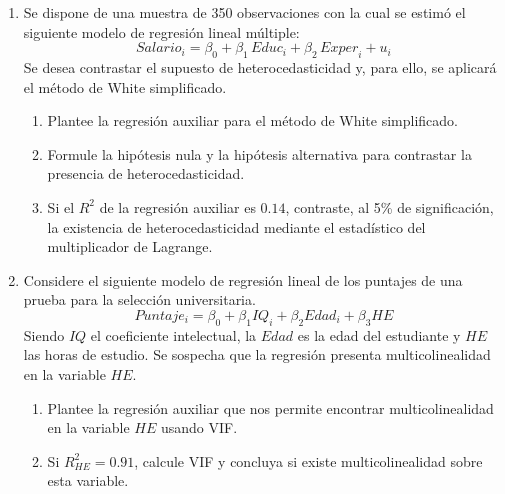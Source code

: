 \documentclass[10pt,a4paper]{article}
\begin{document}
\begin{enumerate}

\item Se dispone de una muestra de 350 observaciones con la cual se estimó el siguiente modelo de regresión lineal múltiple:
$$Salario_i = \beta_0 + \beta_1\,\textit{Educ}_i + \beta_2\,\textit{Exper}_i + u_i$$
Se desea contrastar el supuesto de heterocedasticidad y, para ello, se aplicará el método de White simplificado.
\begin{enumerate}
    \item  Plantee la regresión auxiliar para el método de White simplificado.\\
   
    
    \item  Formule la hipótesis nula y la hipótesis alternativa para contrastar la presencia de heterocedasticidad.\\
    
    
    \item  Si el $R^2$ de la regresión auxiliar es $0.14$, contraste, al 5\% de significación, la existencia de heterocedasticidad mediante el estadístico del multiplicador de Lagrange.\\
    
\end{enumerate}

\item  Considere el siguiente modelo de regresión lineal  de los puntajes de una prueba para la selección universitaria.
$$Puntaje_i = \beta_0 + \beta_1 IQ_i + \beta_2 Edad_i + \beta_3 HE$$
Siendo $IQ$ el coeficiente intelectual, la $Edad$ es la edad del estudiante y $HE$ las horas de estudio. Se sospecha que la regresión presenta multicolinealidad en la variable $HE$. 

\begin{enumerate}
    \item Plantee la regresión auxiliar que nos permite encontrar multicolinealidad en la variable $HE$ usando VIF. \\


    \item  Si $R^2_{HE} = 0.91$, calcule VIF y concluya si existe multicolinealidad sobre esta variable.
\end{enumerate}


\end{enumerate}
\end{document}
